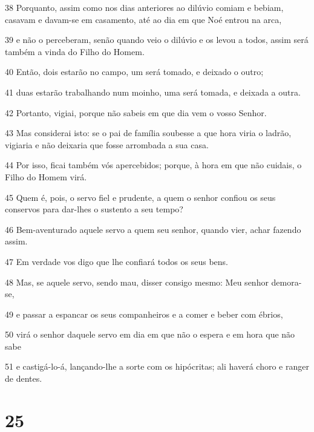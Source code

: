 \par 38 Porquanto, assim como nos dias anteriores ao dilúvio comiam e bebiam, casavam e davam-se em casamento, até ao dia em que Noé entrou na arca,
\par 39 e não o perceberam, senão quando veio o dilúvio e os levou a todos, assim será também a vinda do Filho do Homem.
\par 40 Então, dois estarão no campo, um será tomado, e deixado o outro;
\par 41 duas estarão trabalhando num moinho, uma será tomada, e deixada a outra.
\par 42 Portanto, vigiai, porque não sabeis em que dia vem o vosso Senhor.
\par 43 Mas considerai isto: se o pai de família soubesse a que hora viria o ladrão, vigiaria e não deixaria que fosse arrombada a sua casa.
\par 44 Por isso, ficai também vós apercebidos; porque, à hora em que não cuidais, o Filho do Homem virá.
\par 45 Quem é, pois, o servo fiel e prudente, a quem o senhor confiou os seus conservos para dar-lhes o sustento a seu tempo?
\par 46 Bem-aventurado aquele servo a quem seu senhor, quando vier, achar fazendo assim.
\par 47 Em verdade vos digo que lhe confiará todos os seus bens.
\par 48 Mas, se aquele servo, sendo mau, disser consigo mesmo: Meu senhor demora-se,
\par 49 e passar a espancar os seus companheiros e a comer e beber com ébrios,
\par 50 virá o senhor daquele servo em dia em que não o espera e em hora que não sabe
\par 51 e castigá-lo-á, lançando-lhe a sorte com os hipócritas; ali haverá choro e ranger de dentes.

\chapter{25}

